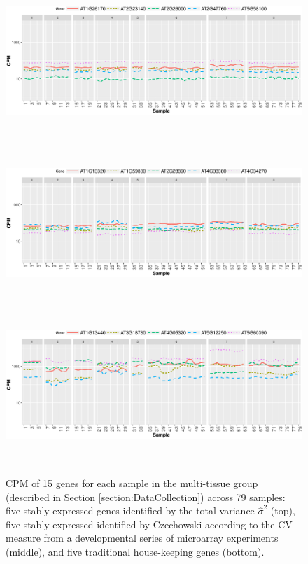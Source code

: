 \documentclass[letterpaper,12pt]{article}
\begin{document}

 \begin{figure}[H]
\begin{center}
	\includegraphics[width=15cm,height=6cm]{Figures/A3.eps}
	\includegraphics[width=15cm,height=6cm]{Figures/A2.eps}
	\includegraphics[width=15cm,height=6cm]{Figures/A1.eps}
	\caption{{\small{\label{expressinlevel1}
			CPM of 15 genes for each sample in the multi-tissue group (described in Section \ref{section:DataCollection}) across 79 samples:  five stably expressed genes identified by the total variance $\hat{\sigma}^2$ (top), five stably expressed identified by Czechowski according to the CV measure from a developmental series of microarray experiments (middle), and  five traditional house-keeping genes (bottom). }}}
\end{center}
\end{figure} 
\end{document}
